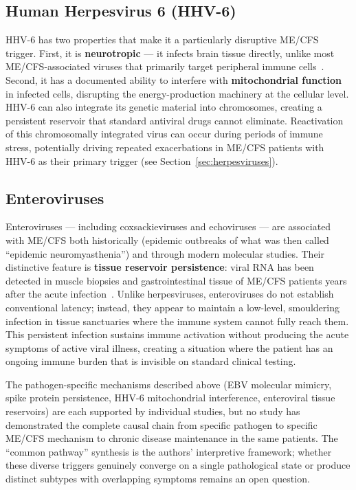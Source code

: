 \subsection{Human Herpesvirus 6 (HHV-6)}

HHV-6 has two properties that make it a particularly disruptive ME/CFS trigger. First, it is \textbf{neurotropic} --- it infects brain tissue directly, unlike most ME/CFS-associated viruses that primarily target peripheral immune cells~\cite{Rasa2018}. Second, it has a documented ability to interfere with \textbf{mitochondrial function} in infected cells, disrupting the energy-production machinery at the cellular level. HHV-6 can also integrate its genetic material into chromosomes, creating a persistent reservoir that standard antiviral drugs cannot eliminate. Reactivation of this chromosomally integrated virus can occur during periods of immune stress, potentially driving repeated exacerbations in ME/CFS patients with HHV-6 as their primary trigger (see Section~\ref{sec:herpesviruses}).

\subsection{Enteroviruses}

Enteroviruses --- including coxsackieviruses and echoviruses --- are associated with ME/CFS both historically (epidemic outbreaks of what was then called ``epidemic neuromyasthenia'') and through modern molecular studies. Their distinctive feature is \textbf{tissue reservoir persistence}: viral RNA has been detected in muscle biopsies and gastrointestinal tissue of ME/CFS patients years after the acute infection~\cite{Rasa2018}. Unlike herpesviruses, enteroviruses do not establish conventional latency; instead, they appear to maintain a low-level, smouldering infection in tissue sanctuaries where the immune system cannot fully reach them. This persistent infection sustains immune activation without producing the acute symptoms of active viral illness, creating a situation where the patient has an ongoing immune burden that is invisible on standard clinical testing.

\begin{limitation}
The pathogen-specific mechanisms described above (EBV molecular mimicry, spike protein persistence, HHV-6 mitochondrial interference, enteroviral tissue reservoirs) are each supported by individual studies, but no study has demonstrated the complete causal chain from specific pathogen to specific ME/CFS mechanism to chronic disease maintenance in the same patients. The ``common pathway'' synthesis is the authors' interpretive framework; whether these diverse triggers genuinely converge on a single pathological state or produce distinct subtypes with overlapping symptoms remains an open question.
\end{limitation}

